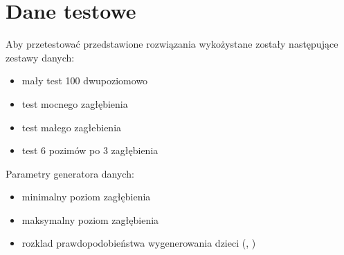 \documentclass[10pt,a4paper,oneside]{book}
\begin{document}
\section{Dane testowe}

Aby przetestować przedstawione rozwiązania wykożystane zostały następujące zestawy danych:
\begin{itemize}
 \item mały test 100 dwupoziomowo
 \item test mocnego zagłębienia
 \item test małego zagłebienia
 \item test 6 pozimów po 3 zagłębienia 
\end{itemize}


Parametry generatora danych:
\begin{itemize}
 \item minimalny poziom zagłębienia
 \item maksymalny poziom zagłębienia
 \item rozklad prawdopodobieństwa wygenerowania dzieci (\cite{asdf}, \cite[Ala]{asdf})
\end{itemize}







\clearpage
{}
{}
\printindex
\end{document}
